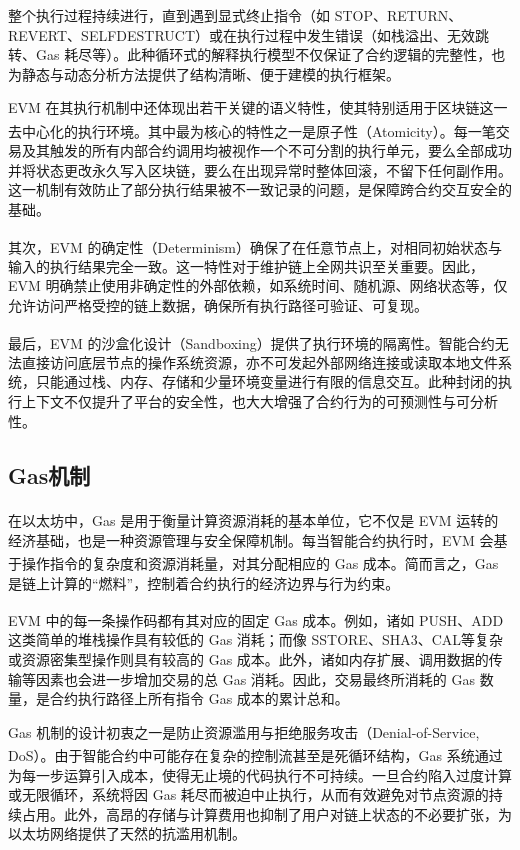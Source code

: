 \documentclass[print, master, vlined, timesmath]{DissertUESTC}
\begin{document}
整个执行过程持续进行，直到遇到显式终止指令（如 STOP、RETURN、REVERT、SELFDESTRUCT）或在执行过程中发生错误（如栈溢出、无效跳转、Gas 耗尽等）。此种循环式的解释执行模型不仅保证了合约逻辑的完整性，也为静态与动态分析方法提供了结构清晰、便于建模的执行框架。

EVM 在其执行机制中还体现出若干关键的语义特性，使其特别适用于区块链这一去中心化的执行环境。其中最为核心的特性之一是原子性（Atomicity）\textsuperscript{\cite{...}}。每一笔交易及其触发的所有内部合约调用均被视作一个不可分割的执行单元，要么全部成功并将状态更改永久写入区块链，要么在出现异常时整体回滚，不留下任何副作用。这一机制有效防止了部分执行结果被不一致记录的问题，是保障跨合约交互安全的基础。

其次，EVM 的确定性（Determinism）\textsuperscript{\cite{...}}确保了在任意节点上，对相同初始状态与输入的执行结果完全一致。这一特性对于维护链上全网共识至关重要。因此，EVM 明确禁止使用非确定性的外部依赖，如系统时间、随机源、网络状态等，仅允许访问严格受控的链上数据，确保所有执行路径可验证、可复现。

最后，EVM 的沙盒化设计（Sandboxing）\textsuperscript{\cite{...}}提供了执行环境的隔离性。智能合约无法直接访问底层节点的操作系统资源，亦不可发起外部网络连接或读取本地文件系统，只能通过栈、内存、存储和少量环境变量进行有限的信息交互。此种封闭的执行上下文不仅提升了平台的安全性，也大大增强了合约行为的可预测性与可分析性。

\subsection{Gas机制}

在以太坊中，Gas 是用于衡量计算资源消耗的基本单位\textsuperscript{\cite{...}}，它不仅是 EVM 运转的经济基础，也是一种资源管理与安全保障机制。每当智能合约执行时，EVM 会基于操作指令的复杂度和资源消耗量，对其分配相应的 Gas 成本\textsuperscript{\cite{...}}。简而言之，Gas 是链上计算的“燃料”，控制着合约执行的经济边界与行为约束。

EVM 中的每一条操作码都有其对应的固定 Gas 成本\textsuperscript{\cite{...}}。例如，诸如 PUSH、ADD 这类简单的堆栈操作具有较低的 Gas 消耗；而像 SSTORE、SHA3、CAL等复杂或资源密集型操作则具有较高的 Gas 成本。此外，诸如内存扩展、调用数据的传输等因素也会进一步增加交易的总 Gas 消耗。因此，交易最终所消耗的 Gas 数量，是合约执行路径上所有指令 Gas 成本的累计总和。

Gas 机制的设计初衷之一是防止资源滥用与拒绝服务攻击（Denial-of-Service, DoS）\textsuperscript{\cite{...}}。由于智能合约中可能存在复杂的控制流甚至是死循环结构，Gas 系统通过为每一步运算引入成本，使得无止境的代码执行不可持续。一旦合约陷入过度计算或无限循环，系统将因 Gas 耗尽而被迫中止执行，从而有效避免对节点资源的持续占用。此外，高昂的存储与计算费用也抑制了用户对链上状态的不必要扩张，为以太坊网络提供了天然的抗滥用机制。
\end{document}
